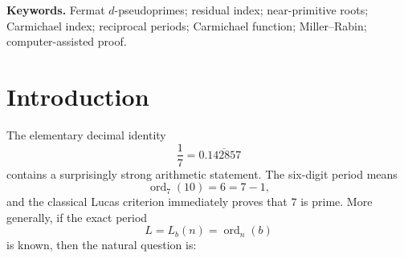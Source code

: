 \documentclass[11pt]{article}
\newcommand{\ord}{\operatorname{ord}}
\begin{document}
\begin{abstract}
The base-independent genuine spectrum is also shown to be a partition of all
odd composite integers: each odd composite appears exactly once at its genuine
index
\[
d_\lambda(n)=\frac{n-1}{\gcd(n-1,\lambda(n))},
\]
while all later appearances are inherited.  We certify the complete inclusive
spectrum through $d=64$, study the fixed-base prime spectrum via the
Wagstaff--Moree near-primitive-root densities, and prove under GRH that the
same range contains at least $98.2709160681865\ldots\%$ of the prime mass for
every positive non-perfect-power integer base.  We also introduce the counting functions $e(d)$ and $g(d)$.  The
$\kappa$--$H$ search decomposition has
$\frac12d(\log d)^2+O(d\log d)$ overlap-resolved branches, while collapsing to the Diophantine master equation gives a relaxed parameter count of only
$d\log d+O(d)$ candidate pairs.  A divisor-pair identity for the
last two prime factors then yields the uniform counting estimate
\[
\log e(d)\le
\frac d2\bigl(\log d+\log\log d+O(1)\bigr).
\]
In particular the one-, two-, and three-distinct-prime strata satisfy
$e_1(d)\le d^{o(1)}$ and $e_2(d),e_3(d)\le d^{1+o(1)}$.
Under a natural uniform sampling model on a spectral line, for fixed $d$ we
prove
\[
\Pr_X(n\text{ prime}\mid d)
=1-e(d)\phi(d)\frac{\log X}{X}
+o\!\left(\frac{\log X}{X}\right).
\]
More strongly, for every fixed $0<\varepsilon<2$ this probability tends to
$1$ uniformly throughout
\[
1\le d\le(2-\varepsilon)\frac{\log X}{\log\log X}.
\]
Thus the deterministic certainty range with leading constant $1/2$ is
complemented by a substantially wider high-probability range, in the stated
sampling model, with leading constant $2$.  Four proposed OEIS sequences are
printed in full through $d=64$.
\end{abstract}

\noindent\textbf{Keywords.} Fermat $d$-pseudoprimes; residual index;
near-primitive roots; Carmichael index; reciprocal periods; Carmichael function;
Miller--Rabin; computer-assisted proof.

\medskip
\tableofcontents
\bigskip


\section{Introduction}
\label{sec:introduction}

The elementary decimal identity
\[
\frac17=0.\overline{142857}
\]
contains a surprisingly strong arithmetic statement.  The six-digit period
means
\[
\ord_7(10)=6=7-1,
\]
and the classical Lucas criterion immediately proves that $7$ is prime.  More
generally, if the exact period
\[
L=L_b(n)=\ord_n(b)
\]
is known, then the natural question is:
\end{document}

